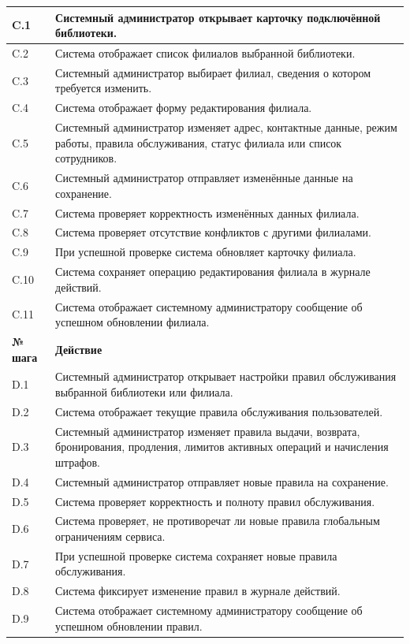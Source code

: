 \documentclass[12pt,a4paper]{article}
\begin{document}
\begin{xltabular}{\textwidth}{
				|>{\raggedright\arraybackslash}p{2.7cm}
				|>{\raggedright\arraybackslash}X|
			}
			C.1 & Системный администратор открывает карточку подключённой библиотеки. \\
			\hline
			C.2 & Система отображает список филиалов выбранной библиотеки. \\
			\hline
			C.3 & Системный администратор выбирает филиал, сведения о котором требуется
			изменить. \\
			\hline
			C.4 & Система отображает форму редактирования филиала. \\
			\hline
			C.5 & Системный администратор изменяет адрес, контактные данные, режим
			работы, правила обслуживания, статус филиала или список сотрудников. \\
			\hline
			C.6 & Системный администратор отправляет изменённые данные на сохранение. \\
			\hline
			C.7 & Система проверяет корректность изменённых данных филиала. \\
			\hline
			C.8 & Система проверяет отсутствие конфликтов с другими филиалами. \\
			\hline
			C.9 & При успешной проверке система обновляет карточку филиала. \\
			\hline
			C.10 & Система сохраняет операцию редактирования филиала в журнале
			действий. \\
			\hline
			C.11 & Система отображает системному администратору сообщение об успешном
			обновлении филиала. \\
			\hline
			
			
			\textbf{№ шага} & \textbf{Действие} \\
			\hline
			
			D.1 & Системный администратор открывает настройки правил обслуживания
			выбранной библиотеки или филиала. \\
			\hline
			D.2 & Система отображает текущие правила обслуживания пользователей. \\
			\hline
			D.3 & Системный администратор изменяет правила выдачи, возврата,
			бронирования, продления, лимитов активных операций и начисления
			штрафов. \\
			\hline
			D.4 & Системный администратор отправляет новые правила на сохранение. \\
			\hline
			D.5 & Система проверяет корректность и полноту правил обслуживания. \\
			\hline
			D.6 & Система проверяет, не противоречат ли новые правила глобальным
			ограничениям сервиса. \\
			\hline
			D.7 & При успешной проверке система сохраняет новые правила обслуживания. \\
			\hline
			D.8 & Система фиксирует изменение правил в журнале действий. \\
			\hline
			D.9 & Система отображает системному администратору сообщение об успешном
			обновлении правил. \\
			\hline
			

\end{xltabular}
\end{document}
